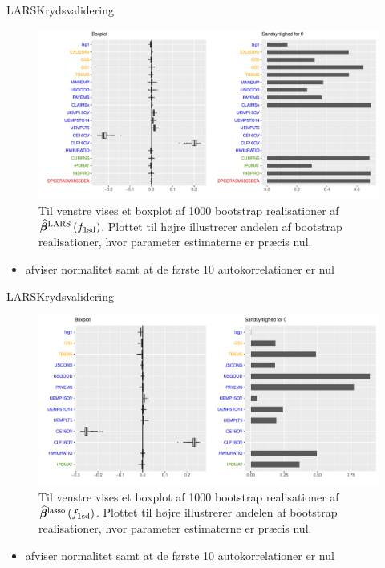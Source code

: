 \begin{frame}{LARS}{Krydsvalidering}
\begin{figure}
\includegraphics[width=1\linewidth, height=0.7\textheight]{slides/boxplot_lars_kryds.pdf}
\caption{Til venstre vises et boxplot af 1000 bootstrap realisationer af $\widehat{\boldsymbol{\beta}}^{\text{LARS}} \del{f_\text{1sd}} $.
Plottet til højre illustrerer andelen af bootstrap realisationer, hvor parameter estimaterne er præcis nul.}
\end{figure}
\begin{itemize}
\item afviser normalitet samt at de første 10 autokorrelationer er nul
\end{itemize}
\end{frame}

\begin{frame}{LARS}{Krydsvalidering}
\begin{figure}
\includegraphics[width=1\linewidth, height=0.7\textheight]{slides/boxplot_lasso_kryds.pdf}
\caption{Til venstre vises et boxplot af 1000 bootstrap realisationer af $\widehat{\boldsymbol{\beta}}^{\text{lasso}} \del{f_\text{1sd}} $.
Plottet til højre illustrerer andelen af bootstrap realisationer, hvor parameter estimaterne er præcis nul.}
\end{figure}
\begin{itemize}
\item afviser normalitet samt at de første 10 autokorrelationer er nul
\end{itemize}
\end{frame}

